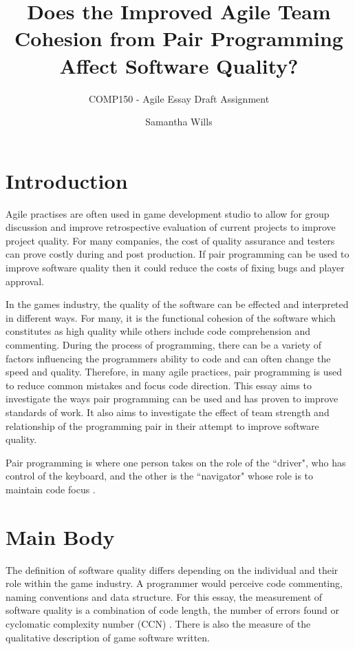 \documentclass{scrartcl}
\title{Does the Improved Agile Team Cohesion from Pair Programming Affect Software Quality?}
\subtitle{COMP150 - Agile Essay Draft Assignment}
\author{Samantha Wills}
\begin{document}
\maketitle

\section*{Introduction}
Agile practises are often used in game development studio to allow for group discussion and improve retrospective evaluation of current projects to improve project quality. For many companies, the cost of quality assurance and testers can prove costly during and post production. If pair programming can be used to improve software quality then it could reduce the costs of fixing bugs and player approval.

In the games industry, the quality of the software can be effected and interpreted in different ways. For many, it is the functional cohesion of the software which constitutes as high quality while others include code comprehension and commenting. During the process of programming, there can be a variety of factors influencing the programmers ability to code and can often change the speed and quality. Therefore, in many agile practices, pair programming is used to reduce common mistakes and focus code direction. This essay aims to investigate the ways pair programming can be used and has proven to improve standards of work. It also aims to investigate the effect of team strength and relationship of the programming pair in their attempt to improve software quality.

Pair programming is where one person takes on the role of the ``driver", who has control of the keyboard, and the other is the ``navigator" whose role is to maintain code focus \cite{Hulkko:2005}. 

\section*{Main Body}

The definition of software quality differs depending on the individual and their role within the game industry. A programmer would perceive code commenting, naming conventions and data structure. For this essay, the measurement of software quality is a combination of code length, the number of errors found or cyclomatic complexity number (CCN)\cite{Xenos:2000} . There is also the measure of the qualitative description of game software written.
\end{document}
